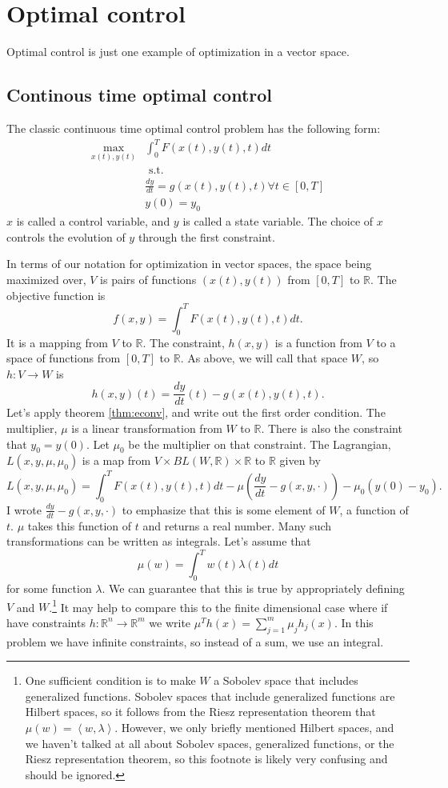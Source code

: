 \documentclass[12pt,reqno]{amsart}
\theoremstyle{definition}
\def\R{\mathbb{R}}
\newcommand{\iprod}[2]{\left\langle {#1} , {#2} \right\rangle}
\renewcommand{\to}{{\rightarrow}}
\begin{document}
\section{Optimal control}


Optimal control is just one example of optimization in a vector
space. 

\subsection{Continous time optimal control}
The classic continuous time optimal control problem has the
following form: 
\begin{align*}
  \max_{x(t),y(t)} & \int_0^T F(x(t),y(t),t) dt \\
  & \text{ s.t.} \\
  & \frac{d y}{dt} = g(x(t),y(t),t) \forall t \in [0,T] \\ 
  & y(0) = y_0
\end{align*}
$x$ is called a control variable, and $y$ is called a state
variable. The choice of $x$ controls the evolution of $y$ through the
first constraint.

In terms of our notation for optimization in vector spaces, the space
being maximized over, $V$ is pairs of functions $(x(t),y(t))$ from
$[0,T]$ to $\R$. The objective function is 
\[ f(x,y) = \int_0^T F(x(t),y(t),t) dt. \]
It is a mapping from $V$ to $\R$. The constraint, $h(x,y)$ is a
function from $V$ to a space of functions from $[0,T]$ to $\R$. As
above, we will call that space $W$, so $h:V \to W$ is 
\[ h(x,y)(t) = \frac{dy}{dt}(t) - g(x(t),y(t),t). \]
Let's apply theorem \ref{thm:econv}, and write out the first order
condition. The multiplier, $\mu$ is a linear transformation from $W$
to $\R$. There is also the constraint that $y_0 = y(0)$. Let $\mu_0$
be the multiplier on that constraint.
The Lagrangian, $L(x,y,\mu,\mu_0)$ is a map from $V \times BL(W,\R)
\times \R$
to $\R$ given by
\[ L(x,y,\mu,\mu_0) = \int_0^T F(x(t),y(t),t) dt  -
\mu\left(\frac{dy}{dt} - g(x,y,\cdot) \right) - \mu_0(y(0) - y_0). \]
I wrote $\frac{dy}{dt} - g(x,y,\cdot)$ to emphasize that this is some
element of $W$, a function of $t$. $\mu$ takes this function of $t$
and returns a real number. Many such transformations can be written as
integrals. Let's assume that
\[ \mu(w) = \int_{0}^T w(t) \lambda(t) dt \]
for some function $\lambda$.  We can guarantee that this is true by
appropriately defining $V$ and $W$.\footnote{One sufficient condition
  is to make $W$ a Sobolev space that includes generalized
  functions. Sobolev 
  spaces that include generalized functions are Hilbert spaces, so it
  follows from the Riesz representation theorem that $\mu(w) =
  \iprod{w}{\lambda}$. However, we only briefly mentioned Hilbert
  spaces, and we haven't talked at all about Sobolev spaces,
  generalized functions, or the Riesz representation theorem, so this
  footnote is likely very confusing and should be ignored.} It may
help to compare this to the finite dimensional case where if have
constraints $h: \R^n \to \R^m$ we write $\mu^T h(x) = \sum_{j=1}^m
\mu_j h_j(x)$. In this problem we have infinite constraints, so
instead of a sum, we use an integral. 
\end{document}
